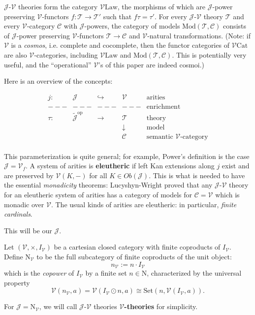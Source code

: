 \documentclass{amsart}
\theoremstyle{definition}
\newcommand{\Set}{\mathrm{Set}}
\newcommand{\Cat}{\mathrm{Cat}}
\newcommand{\Law}{\mathrm{Law}}
\newcommand{\Mod}{\mathrm{Mod}}
\newcommand{\op}{\mathrm{op}}
\newcommand{\NN}{\mathrm{N}}
\newcommand{\V}{\mathscr{V}}
\newcommand{\C}{\mathscr{C}}
\newcommand{\J}{\mathscr{J}}
\newcommand{\T}{\mathscr{T}}
\newcommand{\maps}{\colon}
\begin{document}
$\J$-$\V$ theories form the category $\V\Law$, the morphisms of which are $\J$-power preserving $\V$-functors $f\maps \T \to \T'$ such that $f\tau = \tau'$. For every $\J$-$\V$ theory $\T$ and every $\V$-category $\C$ with $\J$-powers, the category of models $\Mod(\T,\C)$ consists of $\J$-power preserving $\V$-functors $\T\to \C$ and $\V$-natural transformations. (Note: if $\V$ is a \textit{cosmos}, i.e. complete and cocomplete, then the functor categories of $\V\Cat$ are also $\V$-categories, including $\V\Law$ and $\Mod(\T,\C)$. This is potentially very useful, and the ``operational'' $\V$'s of this paper are indeed cosmoi.)

Here is an overview of the concepts: 

\[\begin{array}{ccccl}
j\maps & \J & \hookrightarrow & \V & \text{arities}\\
---& --- & --- & --- & \text{enrichment}\\
\tau\maps & \tilde{\J}^\op & \to & \T & \text{theory}\\
& & & \downarrow & \text{model}\\
& & & \C & \text{semantic $\V$-category}\\
\end{array}\]

This parameterization is quite general; for example, Power's definition is the case $\J = \V_f$. A system of arities is \textbf{eleutheric} if left Kan extensions along $j$ exist and are preserved by $\V(K,-)$ for all $K \in Ob(\J)$. This is what is needed to have the essential \textit{monadicity} theorems: Lucyshyn-Wright proved that any $\J$-$\V$ theory for an eleutheric system of arities has a category of models for $\C = \V$ which is monadic over $\V$. The usual kinds of arities are eleutheric: in particular, \textit{finite cardinals}.

This will be our $\J$.

Let $(\V,\times,I_\V)$ be a cartesian closed category with finite coproducts of $I_\V$. Define $\NN_\V$ to be the full subcategory of finite coproducts of the unit object: $$n_\V := n \cdot I_\V$$ which is the \textit{copower} of $I_\V$ by a finite set $n \in \NN$, characterized by the universal property
\begin{equation}
\V(n_\V,a) = \V(I_\V \odot n,a) \cong \Set(n,\V(I_\V,a)).
\end{equation}

For $\J = \NN_\V$, we will call $\J$-$\V$ theories \textbf{$\V$-theories} for simplicity.
\end{document}

